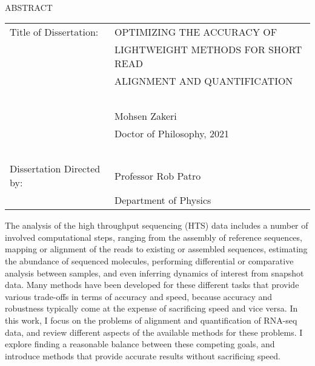 
\hbox{\ }

\renewcommand{\baselinestretch}{1}
\small \normalsize

\begin{center}
\large{{ABSTRACT}}

\vspace{3em}

\end{center}
\hspace{-.15in}
\begin{tabular}{ll}
Title of Dissertation:    & {\large  OPTIMIZING THE ACCURACY OF }\\
&                     {\large  LIGHTWEIGHT METHODS FOR SHORT READ} \\
&                     {\large  ALIGNMENT AND QUANTIFICATION} \\
\ \\
&                          {\large  Mohsen Zakeri} \\
&                           {\large Doctor of Philosophy, 2021} \\
\ \\
Dissertation Directed by: & {\large  Professor Rob Patro} \\
&               {\large  Department of Physics } \\
\end{tabular}

\vspace{3em}

\renewcommand{\baselinestretch}{2}
\large \normalsize

The analysis of the high throughput sequencing (HTS) data includes a number 
of involved computational steps, ranging from the assembly of reference 
sequences, mapping or alignment of the reads to existing or assembled 
sequences, estimating the abundance of sequenced molecules, performing 
differential or comparative analysis between samples, and even inferring 
dynamics of interest from snapshot data. Many methods have been developed 
for these different tasks that provide various trade-offs in terms of 
accuracy and speed, because accuracy and robustness typically come at the 
expense of sacrificing speed and vice versa. In this work, I focus on the 
problems of alignment and quantification of RNA-seq data, and review 
different aspects of the available methods for these problems. I explore 
finding a reasonable balance between these competing goals, and introduce 
methods that provide accurate results without sacrificing speed.

